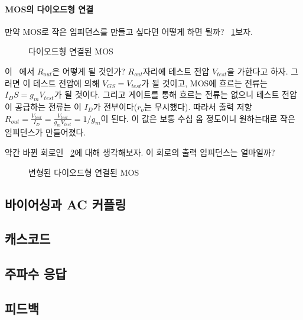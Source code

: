 \paragraph{MOS의 다이오드형 연결}
만약 MOS로 작은 임피던스를 만들고 싶다면 어떻게 하면 될까? \figurename~\ref{fig:diode connected}\를 보자.
\begin{figure}[!tbp]
    \centering
    \caption{다이오드형 연결된 MOS}\label{fig:diode connected}
\end{figure}
이 \figurename~에서 $R_{out}$은 어떻게 될 것인가? $R_{out}$자리에 테스트 전압 $V_{test}$을 가한다고 하자. 그러면 이 테스트 전압에 의해 $V_{GS}=V_{test}$가 될 것이고, MOS에 흐르는 전류는 $I_DS=g_mV_{test}$가 될 것이다.
그리고 게이트를 통해 흐르는 전류는 없으니 테스트 전압이 공급하는 전류는 이 $I_D$가 전부이다($r_o$는 무시했다). 따라서 출력 저항 $R_{out}=\frac{V_{test}}{I_D}=\frac{V_{test}}{g_mV_{test}}=1/g_m$이 된다. 이 값은 보통 수십 옴 정도이니 원하는대로 작은 임피던스가 만들어졌다.

약간 바뀐 회로인 \figurename~\ref{fig:diode connected with RD}에 대해 생각해보자. 이 회로의 출력 임피던스는 얼마일까?
\begin{figure}[!hbp]
    \centering
    \caption{변형된 다이오드형 연결된 MOS}\label{fig:diode connected with RD}
\end{figure}

\subsection{바이어싱과 AC 커플링}

\subsection{캐스코드}

\subsection{주파수 응답}

\subsection{피드백}